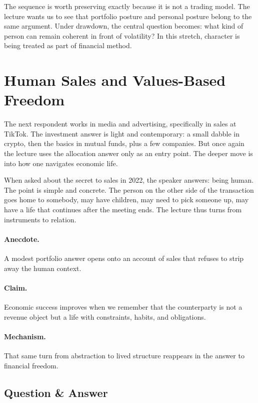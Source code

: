 The sequence is worth preserving exactly because it is not a trading model. The lecture wants us to see that portfolio posture and personal posture belong to the same argument. Under drawdown, the central question becomes: what kind of person can remain coherent in front of volatility? In this stretch, character is being treated as part of financial method.

\section{Human Sales and Values-Based Freedom}

The next respondent works in media and advertising, specifically in sales at TikTok. The investment answer is light and contemporary: a small dabble in crypto, then the basics in mutual funds, plus a few companies. But once again the lecture uses the allocation answer only as an entry point. The deeper move is into how one navigates economic life.

When asked about the secret to sales in 2022, the speaker answers: being human. The point is simple and concrete. The person on the other side of the transaction goes home to somebody, may have children, may need to pick someone up, may have a life that continues after the meeting ends. The lecture thus turns from instruments to relation.

\paragraph{Anecdote.}
A modest portfolio answer opens onto an account of sales that refuses to strip away the human context.

\paragraph{Claim.}
Economic success improves when we remember that the counterparty is not a revenue object but a life with constraints, habits, and obligations.

\paragraph{Mechanism.}
That same turn from abstraction to lived structure reappears in the answer to financial freedom.

\subsection{Question \& Answer}

